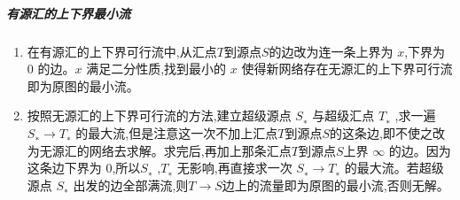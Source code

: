 \subparagraph{有源汇的上下界最小流}
\begin{enumerate}
\item 在有源汇的上下界可行流中,从汇点$ T $到源点$ S $的边改为连一条上界为 $x$,下界为 0 的边。$x$ 满足二分性质,找到最小的 $x$ 使得新网络存在无源汇的上下界可行流即为原图的最小流。
\item 按照无源汇的上下界可行流的方法,建立超级源点 $S_∗$ 与超级汇点 $T_∗$ ,求一遍 $S_∗ \rightarrow T_∗$ 的最大流,但是注意这一次不加上汇点$ T $到源点$ S $的这条边,即不使之改为无源汇的网络去求解。求完后,再加上那条汇点$ T $到源点$ S $上界 $\infty$ 的边。因为这条边下界为 0,所以$S_∗$ ,$T_∗$ 无影响,再直接求一次 $S_∗ \rightarrow T_∗$ 的最大流。若超级源点 $S_∗$ 出发的边全部满流,则$T \rightarrow S $边上的流量即为原图的最小流,否则无解。
\end{enumerate}
